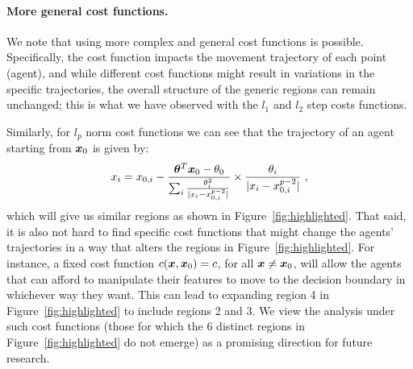 \paragraph{More general cost functions.} We note that using more complex and general cost functions is possible. Specifically, the cost function impacts the movement trajectory of each point (agent), and while different cost functions might result in variations in the specific trajectories, the overall structure of the generic regions can remain unchanged; this is what we have observed with the $l_1$ and $l_2$ step costs functions. %

{Similarly, for $l_p$ norm cost functions we can see that the trajectory of an agent starting from ${\bm{x}}_0$ is given by:
\begin{align}
    x_i = x_{0,i} - \frac{{\bm{\theta}}^T{\bm{x}}_0 - \theta_0}{\sum_i \frac{\theta_i^2}{|x_i-x_{0,i}^{p-2}|}}\times \frac{\theta_i}{|x_i-x_{0,i}^{p-2}|}~,
\end{align}
which will give us similar regions as shown in Figure~\ref{fig:highlighted}. That said, it is also not hard to find specific cost functions that might change the agents' trajectories in a way that alters the regions in Figure~\ref{fig:highlighted}. For instance, a fixed cost function $c({\bm{x}},{\bm{x}}_0) = c$, for all ${\bm{x}}\neq{\bm{x}}_0$, will allow the agents that can afford to manipulate their features to move to the decision boundary in whichever way they want. This can lead to expanding region 4 in Figure~\ref{fig:highlighted} to include regions 2 and 3. We view the analysis under such cost functions (those for which the 6 distinct regions in Figure~\ref{fig:highlighted} do not emerge) as a promising direction for future research.}